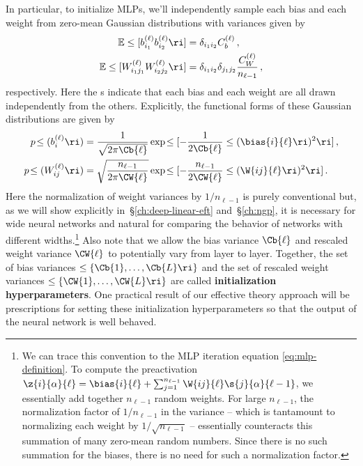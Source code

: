 In particular, to initialize MLPs, we'll
independently sample each bias and each weight from zero-mean Gaussian distributions with variances given by
\begin{align}
\label{eq:bias-variance-def-naive}
\mathbb{E}\le[b^{(\ell)}_{i_1}b^{(\ell)}_{i_2}\ri]&=\delta_{i_1 i_2} C_{b}^{(\ell)}\, ,\\ %
\label{eq:weight-variance-def-naive}
\mathbb{E}\le[W^{(\ell)}_{i_1 j_1}W^{(\ell)}_{i_2 j_2}\ri]&=\delta_{i_1 i_2} \delta_{j_1 j_2}\frac{C_{W}^{(\ell)}}{n_{\ell-1}}\, ,%
\end{align}
respectively. Here the s indicate that each bias and each weight are all drawn independently from the others.
Explicitly, the functional forms of these Gaussian distributions  are given by
\begin{align}
\label{eq:full-bias-initialization}
p\!\le(b_i^{(\ell)}\ri) &= \frac{1 }{ \sqrt{2\pi \Cb{\ell}} }\exp\!\le[-\frac{1}{2\Cb{\ell} }\le(\bias{i}{\ell}\ri)^2\ri] \, , \\
\label{eq:full-weights-initialization}
p\!\le(W_{ij}^{(\ell)}\ri) &=\sqrt{\frac{n_{\ell-1} }{ 2\pi \CW{\ell}}} \exp\!\le[-\frac{n_{\ell-1}}{2\CW{\ell} } \le(\W{ij}{\ell}\ri)^2\ri] \, .
\end{align}
Here the normalization of weight variances by $1/n_{\ell-1}$ is purely conventional but, as we will show explicitly in~\S\ref{ch:deep-linear-eft} and~\S\ref{ch:ngp}, it is necessary for wide neural networks and natural for comparing the behavior of networks with different widths.\footnote{We can trace this convention to the MLP iteration equation \eqref{eq:mlp-definition}. To compute the preactivation $\z{i}{\alpha}{\ell}=\bias{i}{\ell}+\sum_{j=1}^{n_{\ell-1}}\W{ij}{\ell}\s{j}{\alpha}{\ell-1}$, we essentially add together $n_{\ell-1}$ random weights. For large $n_{\ell-1}$, the normalization factor of $1/n_{\ell-1}$ in the variance -- which is tantamount to normalizing each weight by $1/\sqrt{n_{\ell-1}}$ -- essentially counteracts this summation of many zero-mean random numbers.
Since there is no such summation for the biases, there is no need for such a normalization factor.
}
Also note that we allow the bias variance $\Cb{\ell}$ and rescaled weight variance $\CW{\ell}$ to potentially vary from layer to layer.
Together, the set of bias variances $\le\{\Cb{1}, \ldots, \Cb{L}\ri\}$ and the set of rescaled weight variances $\le\{\CW{1}, \ldots, \CW{L}\ri\}$ are called \textbf{initialization hyperparameters}. 
One practical result of our effective theory approach will be prescriptions for setting these initialization hyperparameters so that the output of the neural network is well behaved.














